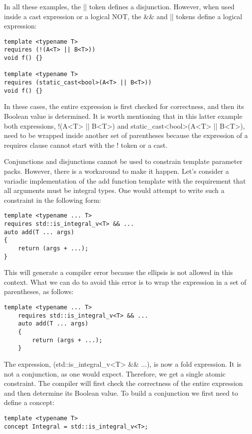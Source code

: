 In all these examples, the || token defines a disjunction. However, when used inside a cast expression or a logical NOT, the \&\& and || tokens define a logical expression:

\begin{lstlisting}[style=styleCXX]
template <typename T>
requires (!(A<T> || B<T>))
void f() {}

template <typename T>
requires (static_cast<bool>(A<T> || B<T>))
void f() {}
\end{lstlisting}

In these cases, the entire expression is first checked for correctness, and then its Boolean value is determined. It is worth mentioning that in this latter example both expressions, !(A<T> || B<T>) and static\_cast<bool>(A<T> || B<T>), need to be wrapped inside another set of parentheses because the expression of a requires clause cannot start with the ! token or a cast.

Conjunctions and disjunctions cannot be used to constrain template parameter packs. However, there is a workaround to make it happen. Let’s consider a variadic implementation of the add function template with the requirement that all arguments must be integral types. One would attempt to write such a constraint in the following form:

\begin{lstlisting}[style=styleCXX]
template <typename ... T>
requires std::is_integral_v<T> && ...
auto add(T ... args)
{
	return (args + ...);
}
\end{lstlisting}

This will generate a compiler error because the ellipsis is not allowed in this context. What we can do to avoid this error is to wrap the expression in a set of parentheses, as follows:

\begin{lstlisting}[style=styleCXX]
	template <typename ... T>
	requires std::is_integral_v<T> && ...
	auto add(T ... args)
	{
		return (args + ...);
	}
\end{lstlisting}

The expression, (std::is\_integral\_v<T> \&\& ...), is now a fold expression. It is not a conjunction, as one would expect. Therefore, we get a single atomic constraint. The compiler will first check the correctness of the entire expression and then determine its Boolean value. To build a conjunction we first need to define a concept:

\begin{lstlisting}[style=styleCXX]
template <typename T>
concept Integral = std::is_integral_v<T>;
\end{lstlisting}

